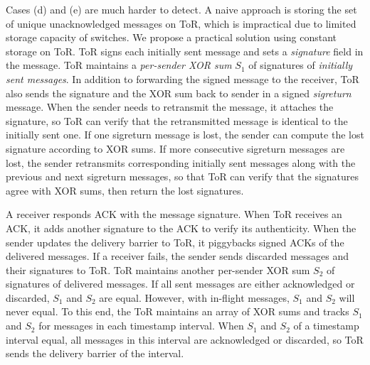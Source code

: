 {Cases (d) and (e) are much harder to detect.
A naive approach is storing the set of unique unacknowledged messages on ToR, which is impractical due to limited storage capacity of switches. %
We propose a practical solution using constant storage on ToR.
ToR signs each initially sent message and sets a \emph{signature} field in the message. %
ToR maintains a \emph{per-sender XOR sum} $S_1$ of signatures of \emph{initially sent messages}.
In addition to forwarding the signed message to the receiver, ToR also sends the signature and the XOR sum back to sender in a signed \emph{sigreturn} message.
When the sender needs to retransmit the message, it attaches the signature, so ToR can verify that the retransmitted message is identical to the initially sent one.
If one sigreturn message is lost, the sender can compute the lost signature according to  XOR sums.
If more consecutive sigreturn messages are lost, the sender retransmits corresponding initially sent messages along with the previous and next sigreturn messages, so that ToR can verify that the signatures agree with XOR sums, then return the lost signatures.

A receiver responds ACK with the message signature.
When ToR receives an ACK, it adds another signature to the ACK to verify its authenticity.
When the sender updates the delivery barrier to ToR, it piggybacks signed ACKs of the delivered messages.
If a receiver fails, the sender sends discarded messages and their signatures to ToR.
ToR maintains another per-sender XOR sum $S_2$ of signatures of delivered messages.
If all sent messages are either acknowledged or discarded, $S_1$ and $S_2$ are equal.
However, with in-flight messages, $S_1$ and $S_2$ will never equal.
To this end, the ToR maintains an array of XOR sums and tracks $S_1$ and $S_2$ for messages in each timestamp interval.
When $S_1$ and $S_2$ of a timestamp interval equal, all messages in this interval are acknowledged or discarded, so ToR sends the delivery barrier of the interval.

}
